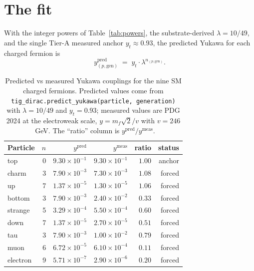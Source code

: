 \documentclass[11pt,reqno]{amsart}
\theoremstyle{plain}
\theoremstyle{definition}
\theoremstyle{remark}
\begin{document}
\section{The fit}\label{sec:fit}

With the integer powers of Table~\ref{tab:powers}, the
substrate-derived $\lambda = 10/49$, and the single Tier-A
measured anchor $y_{t} \approx 0.93$, the predicted Yukawa for
each charged fermion is
\[
  y_{(p,\mathrm{gen})}^{\mathrm{pred}}
  \;=\; y_{t} \cdot \lambda^{n_{(p,\mathrm{gen})}}.
\]

\begin{table}[h]
\centering
\caption{Predicted vs measured Yukawa couplings for the nine SM
charged fermions. Predicted values come from
\texttt{tig\_dirac.predict\_yukawa(particle, generation)} with
$\lambda = 10/49$ and $y_{t} = 0.93$; measured values are PDG
2024 at the electroweak scale, $y = m_{f}\sqrt{2}/v$ with $v =
246$~GeV. The ``ratio'' column is
$y^{\mathrm{pred}}/y^{\mathrm{meas}}$.}
\label{tab:fit}
\begin{tabular}{lrrrrr}
\toprule
Particle & $n$ & $y^{\mathrm{pred}}$ & $y^{\mathrm{meas}}$ & ratio & status \\
\midrule
top      & 0 & $9.30 \times 10^{-1}$ & $9.30 \times 10^{-1}$ & $1.00$ & anchor \\
charm    & 3 & $7.90 \times 10^{-3}$ & $7.30 \times 10^{-3}$ & $1.08$ & forced \\
up       & 7 & $1.37 \times 10^{-5}$ & $1.30 \times 10^{-5}$ & $1.06$ & forced \\
bottom   & 3 & $7.90 \times 10^{-3}$ & $2.40 \times 10^{-2}$ & $0.33$ & forced \\
strange  & 5 & $3.29 \times 10^{-4}$ & $5.50 \times 10^{-4}$ & $0.60$ & forced \\
down     & 7 & $1.37 \times 10^{-5}$ & $2.70 \times 10^{-5}$ & $0.51$ & forced \\
tau      & 3 & $7.90 \times 10^{-3}$ & $1.00 \times 10^{-2}$ & $0.79$ & forced \\
muon     & 6 & $6.72 \times 10^{-5}$ & $6.10 \times 10^{-4}$ & $0.11$ & forced \\
electron & 9 & $5.71 \times 10^{-7}$ & $2.90 \times 10^{-6}$ & $0.20$ & forced \\
\bottomrule
\end{tabular}
\end{table}
\end{document}
